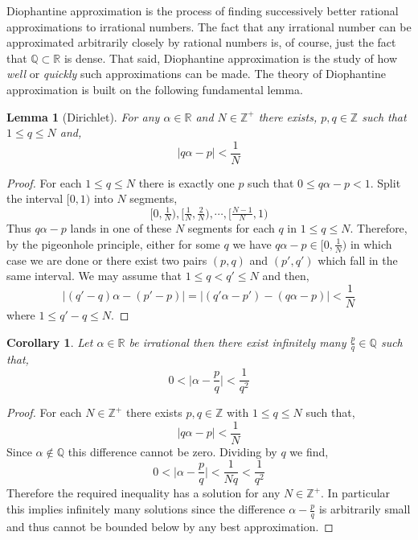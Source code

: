 \documentclass{article}
\newcommand{\Z}{\mathbb{Z}}
\newcommand{\Zplus}{\mathbb{Z}^{+}}
\newcommand{\Q}{\mathbb{Q}}
\newcommand{\R}{\mathbb{R}}
\theoremstyle{theorem}
\newtheorem{lemma}[theorem]{Lemma}
\newtheorem{corollary}[theorem]{Corollary}
\theoremstyle{definition}
\theoremstyle{definition}
\theoremstyle{remark}
\theoremstyle{definition}
\theoremstyle{remark}
\begin{document}
Diophantine approximation is the process of finding successively better rational approximations to irrational numbers. The fact that any irrational number can be approximated arbitrarily closely by rational numbers is, of course, just the fact that $\Q \subset \R$ is dense. That said, Diophantine approximation is the study of how \textit{well} or \textit{quickly} such approximations can be made. The theory of Diophantine approximation is built on the following fundamental lemma.

\begin{lemma}[Dirichlet]
For any $\alpha \in \R$ and $N \in \Zplus$ there exists, $p,q \in \Z$ such that $1 \le q \le N$ and,
\[ |q \alpha - p| < \frac{1}{N} \]
\end{lemma}

\begin{proof}
For each $1 \le q \le N$ there is exactly one $p$ such that $0 \le q \alpha - p < 1$. Split the interval $[0, 1)$ into $N$ segments,
\[ [0, \tfrac{1}{N}) , [\tfrac{1}{N}, \tfrac{2}{N}), \cdots, [\tfrac{N-1}{N}, 1) \]
Thus $q \alpha - p$ lands in one of these $N$ segments for each $q$ in $1 \le q \le N$. Therefore, by the pigeonhole principle, either for some $q$ we have $q \alpha - p \in [0, \tfrac{1}{N})$ in which case we are done or there exist two pairs $(p,q)$ and $(p', q')$ which fall in the same interval. We may assume that $1 \le q < q' \le N$ and then,
\[ |(q' - q) \alpha - (p' - p) | = |(q' \alpha - p') - (q \alpha - p)| < \frac{1}{N} \]
where $1 \le q' - q \le N$. 
\end{proof}

\begin{corollary}
Let $\alpha \in \R$ be irrational then there exist infinitely many $\frac{p}{q} \in \Q$ such that,
\[ 0 < \Big| \alpha - \frac{p}{q} \Big| < \frac{1}{q^2} \]
\end{corollary}

\begin{proof}
For each $N \in \Zplus$ there exists $p,q \in \Z$ with $1 \le q \le N$ such that,
\[ |q \alpha - p| < \frac{1}{N} \]
Since $\alpha \notin \Q$ this difference cannot be zero. Dividing by $q$ we find,
\[ 0 < \Big| \alpha - \frac{p}{q} \Big| < \frac{1}{Nq} < \frac{1}{q^2} \]
Therefore the required inequality has a solution for any $N \in \Zplus$. In particular this implies infinitely many solutions since the difference $\alpha - \frac{p}{q}$ is arbitrarily small and thus cannot be bounded below by any best approximation. 
\end{proof}
\end{document}
